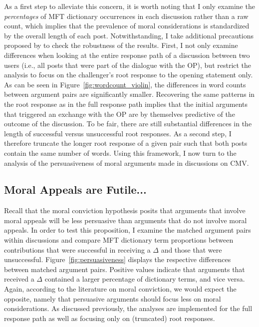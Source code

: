 As a first step to alleviate this concern, it is worth noting that I only examine the \textit{percentages} of MFT dictionary occurrences in each discussion rather than a raw count, which implies that the prevalence of moral considerations is standardized by the overall length of each post. Notwithstanding, I take additional precautions proposed by \citet{tan2016winning} to check the robustness of the results. First, I not only examine differences when looking at the entire response path of a discussion between two users (i.e., all posts that were part of the dialogue with the OP), but restrict the analysis to focus on the challenger's root response to the opening statement only. As can be seen in Figure~\ref{fig:wordcount_violin}, the differences in word counts between argument pairs are significantly smaller. Recovering the same patterns in the root response as in the full response path implies that the initial arguments that triggered an exchange with the OP are by themselves predictive of the outcome of the discussion. To be fair, there are still substantial differences in the length of successful versus unsuccessful root responses. As a second step, I therefore truncate the longer root response of a given pair such that both posts contain the same number of words. Using this framework, I now turn to the analysis of the persuasiveness of moral arguments made in discussions on CMV.


\subsection{Moral Appeals are Futile...}

Recall that the moral conviction hypothesis posits that arguments that involve moral appeals will be less persuasive than arguments that do not involve moral appeals. In order to test this proposition, I examine the matched argument pairs within discussions and compare MFT dictionary term proportions between contributions that were successful in receiving a $\Delta$ and those that were unsuccessful. Figure~\ref{fig:persuasiveness} displays the respective differences between matched argument pairs. Positive values indicate that arguments that received a $\Delta$ contained a larger percentage of dictionary terms, and vice versa. Again, according to the literature on moral conviction, we would expect the opposite, namely that persuasive arguments should focus less on moral considerations. As discussed previously, the analyses are implemented for the full response path as well as focusing only on (truncated) root responses.

